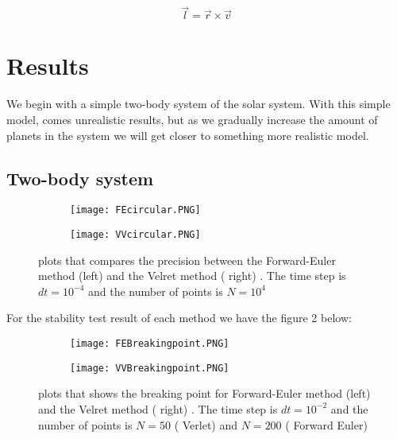 \documentclass{article}
\begin{document}
\begin{equation}
\vec{l} =  \vec{r} \times \vec{v}
\label{eq:AngularMomentum}
\end{equation}
\section{Results}
We begin with a simple two-body system of the solar system. With this simple model, comes unrealistic results, but as we gradually increase the amount of planets in the system we will get closer to something more realistic model. 


\subsection{Two-body system}

\begin{figure}[H]
\begin{subfigure}{\textwidth}
  \centering
  \texttt{[image: FEcircular.PNG]}
  \label{fig:sfig1}
\end{subfigure}%
\begin{subfigure}{\textwidth}
  \centering
  \texttt{[image: VVcircular.PNG]}
  \label{fig:sfig2}
\end{subfigure}
\caption{plots that compares the precision between the Forward-Euler method (left) and the Velret method ( right) . The time step is $dt=10^{-4}$ and the number of points is $N=10^4$ }
\label{fig:fig}
\end{figure}
For the stability test result of each method we have the figure 2 below:
\begin{figure}[H]
\begin{subfigure}{\textwidth}
  \centering
  \texttt{[image: FEBreakingpoint.PNG]}
  \label{fig:sfig1}
\end{subfigure}%
\begin{subfigure}{\textwidth}
  \centering
  \texttt{[image: VVBreakingpoint.PNG]}
  \label{fig:sfig2}
\end{subfigure}
\caption{plots that shows the  breaking point for Forward-Euler method (left) and the Velret method ( right) . The time step is $dt=10^{-2}$ and the number of points is $N=50$ ( Verlet) and $N=200$ ( Forward Euler)  }
\label{fig:fig}
\end{figure}
\end{document}
